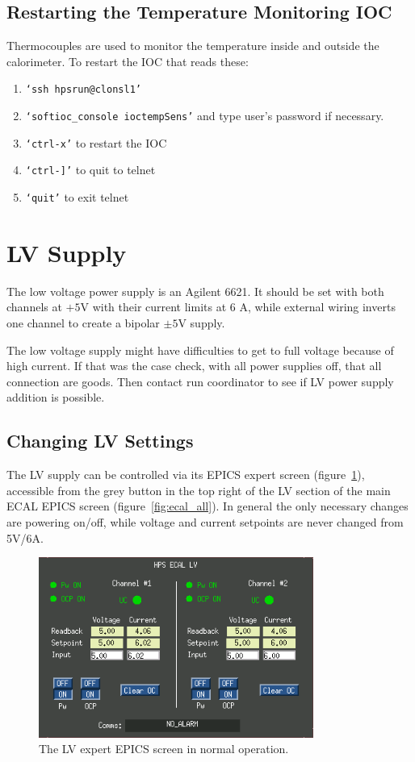 \documentclass[12pt]{article}
\begin{document}
{   \subsection{Restarting the Temperature Monitoring IOC}
   Thermocouples are used to monitor the temperature inside and outside the calorimeter.  To restart the IOC that reads these:
   {\footnotesize
   \begin{enumerate}
       \item \texttt{`ssh hpsrun@clonsl1'}
       \item \texttt{`softioc\_console ioctempSens'} and type user's password if necessary.
       \item \texttt{`ctrl-x'} to restart the IOC
       \item \texttt{`ctrl-]'} to quit to telnet
       \item \texttt{`quit'} to exit telnet
   \end{enumerate}
   }


\newpage
   \section{LV Supply}
      The low voltage power supply is an Agilent 6621.  It should be set with both channels at $+5$V with their current limits at 6 A, while external wiring inverts one channel to create a bipolar $\pm5$V supply. 

      The low voltage supply might have difficulties to get to full voltage because of high current. If that was the case check, with all power supplies off, that all connection are goods. Then contact run coordinator to see if LV power supply addition is possible. 

\subsection{Changing LV Settings}
The LV supply can be controlled via its EPICS expert screen (figure~\ref{lvexpert}), accessible from the grey button in the top right of the LV section of the main ECAL EPICS screen (figure~\ref{fig:ecal_all}). In general the only necessary changes are powering on/off, while voltage and current setpoints are never changed from 5V/6A.
\begin{figure}[htbp]\centering
    \includegraphics[width=9cm]{pics/lvexpert}
    \caption{The LV expert EPICS screen in normal operation.\label{lvexpert}}
\end{figure}

}
\end{document}
